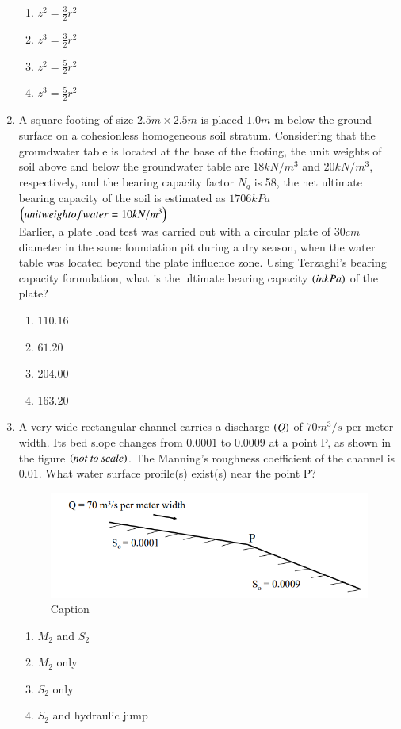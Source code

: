 \documentclass[journal,12pt,onecolumn]{IEEEtran}
\theoremstyle{remark}
\begin{document}
\begin{enumerate}
\hfill{}
\begin{enumerate}
\item $z^2=\frac{3}{2}r^2$
\item $z^3=\frac{3}{2}r^2$
\item $z^2=\frac{5}{2}r^2$
\item $z^3=\frac{5}{2}r^2$
\end{enumerate}

\item A square footing of size $2.5m\times2.5m$ is placed $1.0m$ m below the ground surface on a cohesionless homogeneous soil stratum. Considering that the groundwater table is located at the base of the footing, the unit weights of soil above and below the groundwater table are $18kN/m^3$ and $20kN/m^3$, respectively, and the bearing capacity factor $N_q$ is 58, the net ultimate bearing capacity of the soil is estimated as $1706kPa$ $\left(unit weight of water=10kN/m^3\right)$\\
Earlier, a plate load test was carried out with a circular plate of $30cm$ diameter in the same foundation pit during a dry season, when the water table was located beyond the plate influence zone. Using Terzaghi’s bearing capacity formulation, what is the ultimate bearing capacity $\left(in kPa\right)$ of the plate?

\hfill{}
\begin{enumerate}
\item $110.16$
\item $61.20$
\item $204.00$
\item $163.20$
\end{enumerate}

\item A very wide rectangular channel carries a discharge $\left(Q\right)$ of $70 m^3/s$ per meter width. Its bed slope changes from $0.0001$ to $0.0009$ at a point P, as shown in the figure $\left(\textit{not to scale}\right)$. The Manning’s roughness coefficient of the channel is $0.01$. What water surface profile(s) exist(s) near the point P?

\hfill{}
\begin{figure}[H]
\centering
\includegraphics[width=0.5\linewidth]{figs/q43.png}
\caption{Caption}
\label{fig:Q.43}
\end{figure}
\begin{enumerate}
\item $M_2$ and $S_2$
\item $M_2$ only
\item $S_2$ only
\item $S_2$ and hydraulic jump
\end{enumerate}


\end{enumerate}
\end{document}
